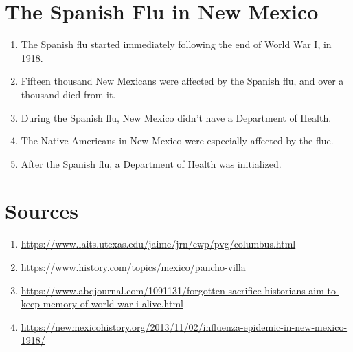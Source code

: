 \documentclass{article}
\begin{document}
\section{The Spanish Flu in New Mexico}
\begin{enumerate}
    \item{The Spanish flu started immediately following the end of World War I, in 1918.}
    \item{Fifteen thousand New Mexicans were affected by the Spanish flu, and over a thousand died from it.}
    \item{During the Spanish flu, New Mexico didn't have a Department of Health.}
    \item{The Native Americans in New Mexico were especially affected by the flue.}
    \item{After the Spanish flu, a Department of Health was initialized.}
\end{enumerate}

\newpage

\section*{Sources}
\begin{enumerate}
    \item{\url{https://www.laits.utexas.edu/jaime/jrn/cwp/pvg/columbus.html}}
    \item{\url{https://www.history.com/topics/mexico/pancho-villa}}
    \item{\url{https://www.abqjournal.com/1091131/forgotten-sacrifice-historians-aim-to-keep-memory-of-world-war-i-alive.html}}
    \item{\url{https://newmexicohistory.org/2013/11/02/influenza-epidemic-in-new-mexico-1918/}}
\end{enumerate}
\end{document}
